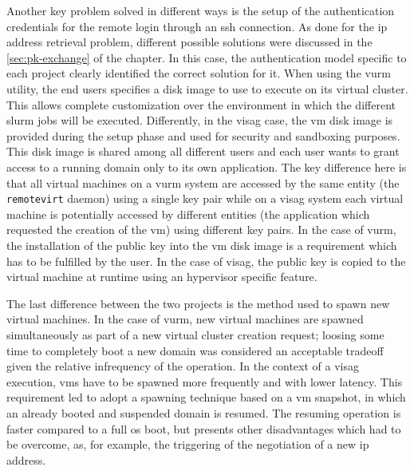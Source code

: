 Another key problem solved in different ways is the setup of the authentication credentials for the remote login through an \gls{ssh} connection. As done for the \gls{ip} address retrieval problem, different possible solutions were discussed in the \autoref{sec:pk-exchange} of the  chapter. In this case, the authentication model specific to each project clearly identified the correct solution for it. When using the \gls{vurm} utility, the end users specifies a disk image to use to execute on its virtual cluster. This allows complete customization over the environment in which the different \gls{slurm} jobs will be executed. Differently, in the \gls{visag} case, the \gls{vm} disk image is provided during the setup phase and used for security and sandboxing purposes. This disk image is shared among all different users and each user wants to grant access to a running domain only to its own application. The key difference here is that all virtual machines on a \gls{vurm} system are accessed by the same entity (the \texttt{remotevirt} daemon) using a single key pair while on a \gls{visag} system each virtual machine is potentially accessed by different entities (the application which requested the creation of the \gls{vm}) using different key pairs.
In the case of \gls{vurm}, the installation of the public key into the \gls{vm} disk image is a requirement which has to be fulfilled by the user. In the case of \gls{visag}, the public key is copied to the virtual machine at runtime using an hypervisor specific feature.

The last difference between the two projects is the method used to spawn new virtual machines. In the case of \gls{vurm}, new virtual machines are spawned simultaneously as part of a new virtual cluster creation request; loosing some time to completely boot a new domain was considered an acceptable tradeoff given the relative infrequency of the operation. In the context of a \gls{visag} execution, \glspl{vm} have to be spawned more frequently and with lower latency. This requirement led to adopt a spawning technique based on a \gls{vm} snapshot, in which an already booted and suspended domain is resumed.
The resuming operation is faster compared to a full \gls{os} boot, but presents other disadvantages which had to be overcome, as, for example, the triggering of the negotiation of a new \gls{ip} address.
